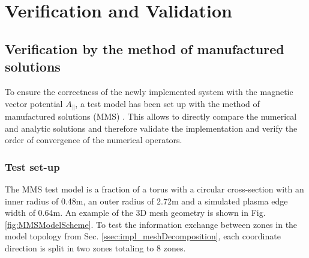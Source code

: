 \chapter{Verification and Validation}
\label{chap:VV}
\section{Verification by the method of manufactured solutions}
To ensure the correctness of the newly implemented system with the magnetic vector potential $A_\parallel$, a test model has been set up with the method of manufactured solutions (MMS) \cite{ManufacturedSolution}. This allows to directly compare the numerical and analytic solutions and therefore validate the implementation and verify the order of convergence of the numerical operators. 

\subsection{Test set-up}
The MMS test model is a fraction of a torus with a circular cross-section with an inner radius of 0.48m, an outer radius of 2.72m and a simulated plasma edge width of 0.64m. An example of the 3D mesh geometry is shown in Fig. \ref{fig:MMSModelScheme}. To test the information exchange between zones in the model topology from Sec. \ref{ssec:impl_meshDecomposition}, each coordinate direction is split in two zones totaling to 8 zones.

